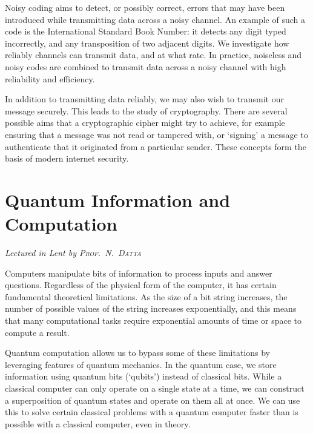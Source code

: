 Noisy coding aims to detect, or possibly correct, errors that may have been introduced while transmitting data across a noisy channel.
An example of such a code is the International Standard Book Number: it detects any digit typed incorrectly, and any transposition of two adjacent digits.
We investigate how reliably channels can transmit data, and at what rate.
In practice, noiseless and noisy codes are combined to transmit data across a noisy channel with high reliability and efficiency.

In addition to transmitting data reliably, we may also wish to transmit our message securely.
This leads to the study of cryptography.
There are several possible aims that a cryptographic cipher might try to achieve, for example ensuring that a message was not read or tampered with, or `signing' a message to authenticate that it originated from a particular sender.
These concepts form the basis of modern internet security.



\chapter[Quantum Information and Computation \\ \textnormal{\emph{Lectured in Lent \oldstylenums{2023} by \textsc{Prof.\ N.\ Datta}}}]{Quantum Information and Computation}
\emph{\Large Lectured in Lent  by \textsc{Prof.\ N.\ Datta}}

Computers manipulate bits of information to process inputs and answer questions.
Regardless of the physical form of the computer, it has certain fundamental theoretical limitations.
As the size of a bit string increases, the number of possible values of the string increases exponentially, and this means that many computational tasks require exponential amounts of time or space to compute a result.

Quantum computation allows us to bypass some of these limitations by leveraging features of quantum mechanics.
In the quantum case, we store information using quantum bits (`qubits') instead of classical bits.
While a classical computer can only operate on a single state at a time, we can construct a superposition of quantum states and operate on them all at once.
We can use this to solve certain classical problems with a quantum computer faster than is possible with a classical computer, even in theory.


